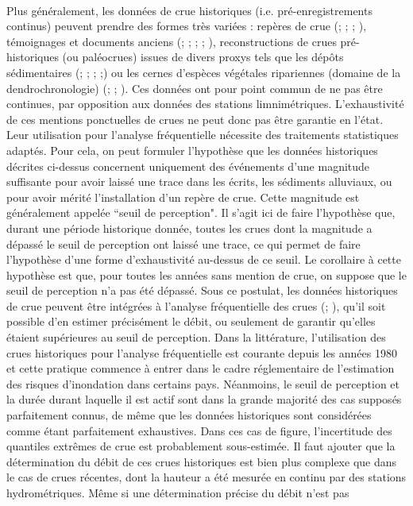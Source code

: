 \documentclass[11pt]{article}
\begin{document}
	\paragraph{} Plus généralement, les données de crue historiques (i.e. pré-enregistrements continus) peuvent prendre des formes très variées : repères de crue (\citet{parkes_defining_2016}; \citet{piotte_collection_2016}; \citet{engeland_new_2020}; \citet{medd_reperes_2023}), témoignages et documents anciens (\citet{pichard_les_1995}; \citet{naulet_flood_2005}; \citet{neppel_flood_2010}; \citet{kjeldsen_documentary_2014}; \citet{macdonald_reassessing_2014}), reconstructions de crues pré-historiques (ou paléocrues) issues de divers proxys tels que les dépôts sédimentaires (\citet{baker_paleoflood_1987}; \citet{dezileau_multidating_2014}; \citet{engeland_new_2020}; \citet{corella_1400-years_2021};\citet{wilhelm_reconstructing_2022}) ou les cernes d'espèces végétales ripariennes (domaine de la dendrochronologie) (\citet{martens_dendrochronological_1992}; \citet{loomans_flood_1993}; \citet{ballesteros-canovas_review_2015}). Ces données ont pour point commun de ne pas être continues, par opposition aux données des stations limnimétriques. L'exhaustivité de ces mentions ponctuelles de crues ne peut donc pas être garantie en l'état. Leur utilisation pour l'analyse fréquentielle nécessite des traitements statistiques adaptés. Pour cela, on peut formuler l'hypothèse que les données historiques décrites ci-dessus concernent uniquement des événements d'une magnitude suffisante pour avoir laissé une trace dans les écrits, les sédiments alluviaux, ou pour avoir mérité l'installation d'un repère de crue. Cette magnitude est généralement appelée ``seuil de perception". Il s'agit ici de faire l'hypothèse que, durant une période historique donnée, toutes les crues dont la magnitude a dépassé le seuil de perception ont laissé une trace, ce qui permet de faire l'hypothèse d'une forme d'exhaustivité au-dessus de ce seuil. Le corollaire à cette hypothèse est que, pour toutes les années sans mention de crue, on suppose que le seuil de perception n'a pas été dépassé. Sous ce postulat, les données historiques de crue peuvent être intégrées à l'analyse fréquentielle des crues (\cite{gerard_probability_1979}; \cite{stedinger_flood_1986}), qu'il soit possible d'en estimer précisément le débit, ou seulement de garantir qu'elles étaient supérieures au seuil de perception. Dans la littérature, l'utilisation des crues historiques pour l'analyse fréquentielle est courante depuis les années 1980 et cette pratique commence à entrer dans le cadre réglementaire de l'estimation des risques d'inondation dans certains pays. Néanmoins, le seuil de perception et la durée durant laquelle il est actif sont dans la grande majorité des cas supposés parfaitement connus, de même que les données historiques sont considérées comme étant parfaitement exhaustives. Dans ces cas de figure, l'incertitude  des quantiles extrêmes de crue est probablement sous-estimée. Il faut ajouter que la détermination du débit de ces crues historiques est bien plus complexe que dans le cas de crues récentes, dont la hauteur a été mesurée en continu par des stations hydrométriques. Même si une détermination précise du débit n'est pas 
\end{document}
